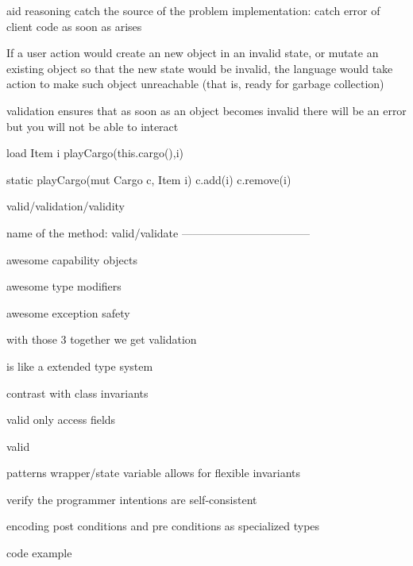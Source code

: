 
aid reasoning
catch the source of the problem
implementation: catch error of client code as soon as arises





If a user action would create an new object in an invalid state, or mutate an existing object so
that the new state would be invalid, the language would take action to make such object unreachable (that is, ready for garbage collection)



validation ensures that as soon as an object becomes invalid there will be an error
but you will not be able to interact 

load Item i
  playCargo(this.cargo(),i)

static playCargo(mut Cargo c, Item i)
  c.add(i)
  c.remove(i)
  
 
valid/validation/validity

name of the method: valid/validate
-----------------------------------


awesome capability objects

awesome type modifiers

awesome exception safety

with those 3 together we get validation

is like a extended type system

contrast with class invariants


valid only access fields

valid


patterns wrapper/state variable allows for flexible invariants

verify the programmer intentions are self-consistent

encoding post conditions and pre conditions as specialized types

code example


